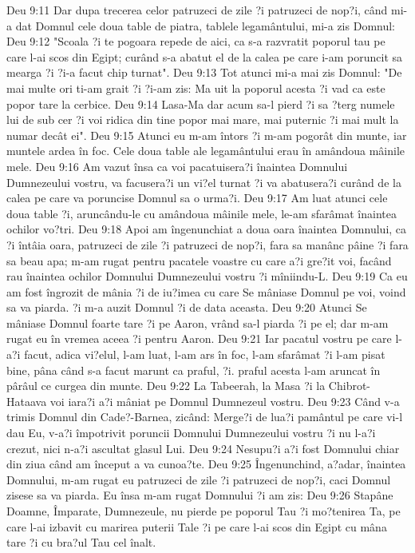 Deu 9:11  Dar dupa trecerea celor patruzeci de zile ?i patruzeci de nop?i, când mi-a dat Domnul cele doua table de piatra, tablele legamântului, mi-a zis Domnul:
Deu 9:12  "Scoala ?i te pogoara repede de aici, ca s-a razvratit poporul tau pe care l-ai scos din Egipt; curând s-a abatut el de la calea pe care i-am poruncit sa mearga ?i ?i-a facut chip turnat".
Deu 9:13  Tot atunci mi-a mai zis Domnul: "De mai multe ori ti-am grait ?i ?i-am zis: Ma uit la poporul acesta ?i vad ca este popor tare la cerbice.
Deu 9:14  Lasa-Ma dar acum sa-l pierd ?i sa ?terg numele lui de sub cer ?i voi ridica din tine popor mai mare, mai puternic ?i mai mult la numar decât ei".
Deu 9:15  Atunci eu m-am întors ?i m-am pogorât din munte, iar muntele ardea în foc. Cele doua table ale legamântului erau în amândoua mâinile mele.
Deu 9:16  Am vazut însa ca voi pacatuisera?i înaintea Domnului Dumnezeului vostru, va facusera?i un vi?el turnat ?i va abatusera?i curând de la calea pe care va poruncise Domnul sa o urma?i.
Deu 9:17  Am luat atunci cele doua table ?i, aruncându-le cu amândoua mâinile mele, le-am sfarâmat înaintea ochilor vo?tri.
Deu 9:18  Apoi am îngenunchiat a doua oara înaintea Domnului, ca ?i întâia oara, patruzeci de zile ?i patruzeci de nop?i, fara sa manânc pâine ?i fara sa beau apa; m-am rugat pentru pacatele voastre cu care a?i gre?it voi, facând rau înaintea ochilor Domnului Dumnezeului vostru ?i mîniindu-L.
Deu 9:19  Ca eu am fost îngrozit de mânia ?i de iu?imea cu care Se mâniase Domnul pe voi, voind sa va piarda. ?i m-a auzit Domnul ?i de data aceasta.
Deu 9:20  Atunci Se mâniase Domnul foarte tare ?i pe Aaron, vrând sa-l piarda ?i pe el; dar m-am rugat eu în vremea aceea ?i pentru Aaron.
Deu 9:21  Iar pacatul vostru pe care l-a?i facut, adica vi?elul, l-am luat, l-am ars în foc, l-am sfarâmat ?i l-am pisat bine, pâna când s-a facut marunt ca praful, ?i. praful acesta l-am aruncat în pârâul ce curgea din munte.
Deu 9:22  La Tabeerah, la Masa ?i la Chibrot-Hataava voi iara?i a?i mâniat pe Domnul Dumnezeul vostru.
Deu 9:23  Când v-a trimis Domnul din Cade?-Barnea, zicând: Merge?i de lua?i pamântul pe care vi-l dau Eu, v-a?i împotrivit poruncii Domnului Dumnezeului vostru ?i nu l-a?i crezut, nici n-a?i ascultat glasul Lui.
Deu 9:24  Nesupu?i a?i fost Domnului chiar din ziua când am început a va cunoa?te.
Deu 9:25  Îngenunchind, a?adar, înaintea Domnului, m-am rugat eu patruzeci de zile ?i patruzeci de nop?i, caci Domnul zisese sa va piarda. Eu însa m-am rugat Domnului ?i am zis:
Deu 9:26  Stapâne Doamne, Împarate, Dumnezeule, nu pierde pe poporul Tau ?i mo?tenirea Ta, pe care l-ai izbavit cu marirea puterii Tale ?i pe care l-ai scos din Egipt cu mâna tare ?i cu bra?ul Tau cel înalt.
